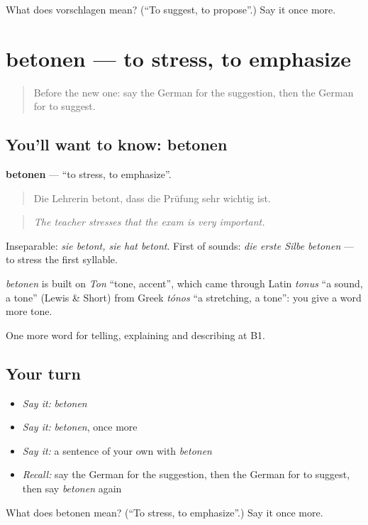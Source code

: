 \begin{tcolorbox}[breakable,colback=teal!4,colframe=teal!35!black,title={Before you move on}]
What does vorschlagen mean? (\textquotedblleft{}To suggest, to propose\textquotedblright{}.) Say it once more.
\end{tcolorbox}
\section[betonen]{betonen — to stress, to emphasize}

\label{lesson:GE-C335-betonen}



\begin{quote}
Before the new one: say the German for the suggestion, then the German for to suggest.
\end{quote}

\subsection*{You'll want to know: betonen}
\textbf{betonen} — \textquotedblleft{}to stress, to emphasize\textquotedblright{}.

\begin{quote}
Die Lehrerin betont, dass die Prüfung sehr wichtig ist.
\end{quote}

\begin{quote}
\emph{The teacher stresses that the exam is very important.}
\end{quote}

Inseparable: \emph{sie betont, sie hat betont}. First of sounds: \emph{die erste Silbe betonen} — to stress the first syllable.

\begin{cousinweb}
\emph{betonen} is built on \emph{Ton} \textquotedblleft{}tone, accent\textquotedblright{}, which came through Latin \emph{tonus} \textquotedblleft{}a sound, a tone\textquotedblright{} (Lewis \& Short) from Greek \emph{tónos} \textquotedblleft{}a stretching, a tone\textquotedblright{}: you give a word more tone.
\end{cousinweb}

\begin{grammarlens}[title={What you've built}]
One more word for telling, explaining and describing at B1.
\end{grammarlens}

\subsection*{Your turn}
\begin{itemize}
\raggedright
  \item \emph{Say it:} \emph{betonen}
  \item \emph{Say it:} \emph{betonen}, once more
  \item \emph{Say it:} a sentence of your own with \emph{betonen}
  \item \emph{Recall:} say the German for the suggestion, then the German for to suggest, then say \emph{betonen} again
\end{itemize}

\begin{tcolorbox}[breakable,colback=teal!4,colframe=teal!35!black,title={Before you move on}]
What does betonen mean? (\textquotedblleft{}To stress, to emphasize\textquotedblright{}.) Say it once more.
\end{tcolorbox}
